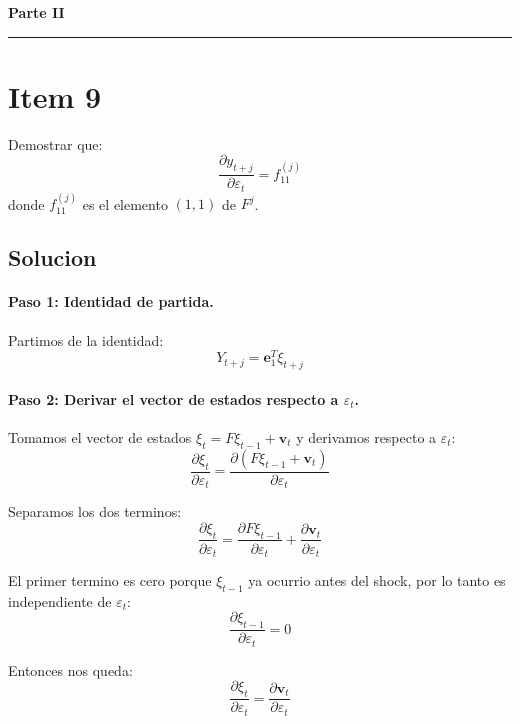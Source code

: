 \begin{center}
    {\LARGE \textbf{Parte II}}\\[6pt]
\end{center}
\vspace{4pt}\hrule\vspace{10pt}

\section*{Item 9}

\begin{enunciado}
Demostrar que:
\[
    \frac{\partial y_{t+j}}{\partial \varepsilon_t} = f_{11}^{(j)}
\]
donde $f_{11}^{(j)}$ es el elemento $(1,1)$ de $F^j$.
\end{enunciado}

\subsection*{Solucion}

\paragraph{Paso 1: Identidad de partida.}
Partimos de la identidad:
\[
    Y_{t+j} = \mathbf{e}_1^T \xi_{t+j}
\]

\paragraph{Paso 2: Derivar el vector de estados respecto a $\varepsilon_t$.}

Tomamos el vector de estados $\xi_t = F\xi_{t-1} + \mathbf{v}_t$ y derivamos respecto a $\varepsilon_t$:
\[
    \frac{\partial \xi_t}{\partial \varepsilon_t}
    = \frac{\partial (F\xi_{t-1} + \mathbf{v}_t)}{\partial \varepsilon_t}
\]

Separamos los dos terminos:
\[
    \frac{\partial \xi_t}{\partial \varepsilon_t}
    = \frac{\partial F\xi_{t-1}}{\partial \varepsilon_t} + \frac{\partial \mathbf{v}_t}{\partial \varepsilon_t}
\]

El primer termino es cero porque $\xi_{t-1}$ ya ocurrio antes del shock, por lo tanto es independiente de $\varepsilon_t$:
\[
    \frac{\partial \xi_{t-1}}{\partial \varepsilon_t} = 0
\]

Entonces nos queda:
\[
    \frac{\partial \xi_t}{\partial \varepsilon_t} = \frac{\partial \mathbf{v}_t}{\partial \varepsilon_t}
\]

